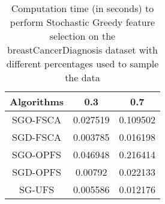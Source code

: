 \begin{table}
	\begin{center}
		\begin{tabular}{c c c}
			Algorithms & 0.3 & 0.7 \\
			\hline
			SGO-FSCA & 0.027519 & 0.109502 \\
			SGD-FSCA & 0.003785 & 0.016198 \\
			SGO-OPFS & 0.046948 & 0.216414 \\
			SGD-OPFS & 0.00792 & 0.022133 \\
			SG-UFS & 0.005586 & 0.012176 \\
		\end{tabular}
	\end{center}
	\caption{Computation time (in seconds) to perform Stochastic Greedy feature selection on the breastCancerDiagnosis dataset with different percentages used to sample the data}
\end{table}